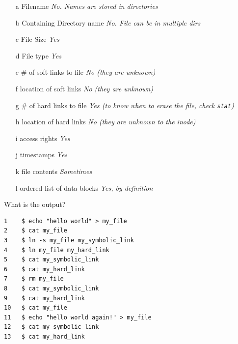 \begin{slide}
    
    \small
    \begin{itemize}
        \item[a] Filename \textit{No. Names are stored in directories}
        \item[b] Containing Directory name \textit{No. File can be in multiple dirs}
        \item[c] File Size \textit{Yes}
        \item[d] File type \textit{Yes}
        \item[e] \# of soft links to file \textit{No (they are unknown)}
        \item[f] location of soft links \textit{No (they are unknown)}
        \item[g] \# of hard links to file \textit{Yes (to know when to erase the file, check \texttt{stat})}
        \item[h] location of hard links \textit{No (they are unknown to the inode)}
        \item[i] access rights \textit{Yes}
        \item[j] timestamps \textit{Yes}
        \item[k] file contents \textit{Sometimes}
        \item[l] ordered list of data blocks \textit{Yes, by definition} 
    \end{itemize}

\end{slide}
  
\begin{slide}

    
	What is the output?
	\bigskip
	
    \begin{verbatim}
1    $ echo "hello world" > my_file
2    $ cat my_file
3    $ ln -s my_file my_symbolic_link
4    $ ln my_file my_hard_link
5    $ cat my_symbolic_link
6    $ cat my_hard_link
7    $ rm my_file
8    $ cat my_symbolic_link
9    $ cat my_hard_link
10   $ cat my_file
11   $ echo "hello world again!" > my_file
12   $ cat my_symbolic_link
13   $ cat my_hard_link
    \end{verbatim}
    
\end{slide}

